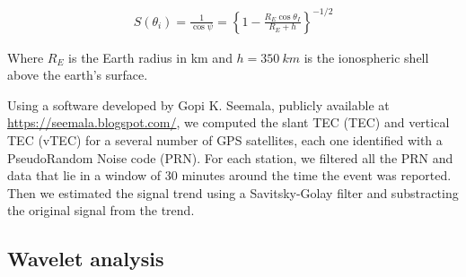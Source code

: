   \begin{align}
    S(\theta_i) = \frac{1}{\cos\psi} = \left\lbrace 1-\frac{R_E\cos\theta_I}{R_E+h}\right\rbrace^{-1/2}
  \end{align}

  Where $R_E$ is the Earth radius in km and $h=\SI{350}{km}$ is the ionospheric shell above the earth's surface.

 Using a software developed by Gopi K. Seemala, publicly available at \url{https://seemala.blogspot.com/}, we computed the slant TEC (TEC) and vertical TEC (vTEC) for a several number of GPS satellites, each one identified with a PseudoRandom Noise code (PRN). For each station, we filtered all the PRN and data that lie in a window of 30 minutes around the time the event was reported. Then we estimated the signal trend using a Savitsky-Golay filter and substracting the original signal from the trend.

  
 
  
  \subsection{Wavelet analysis}

  
     
     

